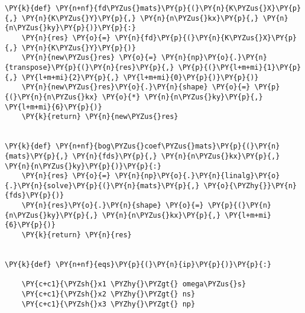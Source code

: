 \begin{Verbatim}[commandchars=\\\{\}]
\PY{k}{def} \PY{n+nf}{fd\PYZus{}mats}\PY{p}{(}\PY{n}{K\PYZus{}X}\PY{p}{,} \PY{n}{K\PYZus{}Y}\PY{p}{,} \PY{n}{n\PYZus{}kx}\PY{p}{,} \PY{n}{n\PYZus{}ky}\PY{p}{)}\PY{p}{:}
    \PY{n}{res} \PY{o}{=} \PY{n}{fd}\PY{p}{(}\PY{n}{K\PYZus{}X}\PY{p}{,} \PY{n}{K\PYZus{}Y}\PY{p}{)}
    \PY{n}{new\PYZus{}res} \PY{o}{=} \PY{n}{np}\PY{o}{.}\PY{n}{transpose}\PY{p}{(}\PY{n}{res}\PY{p}{,} \PY{p}{(}\PY{l+m+mi}{1}\PY{p}{,} \PY{l+m+mi}{2}\PY{p}{,} \PY{l+m+mi}{0}\PY{p}{)}\PY{p}{)}
    \PY{n}{new\PYZus{}res}\PY{o}{.}\PY{n}{shape} \PY{o}{=} \PY{p}{(}\PY{n}{n\PYZus{}kx} \PY{o}{*} \PY{n}{n\PYZus{}ky}\PY{p}{,} \PY{l+m+mi}{6}\PY{p}{)}
    \PY{k}{return} \PY{n}{new\PYZus{}res}


\PY{k}{def} \PY{n+nf}{bog\PYZus{}coef\PYZus{}mats}\PY{p}{(}\PY{n}{mats}\PY{p}{,} \PY{n}{fds}\PY{p}{,} \PY{n}{n\PYZus{}kx}\PY{p}{,} \PY{n}{n\PYZus{}ky}\PY{p}{)}\PY{p}{:}
    \PY{n}{res} \PY{o}{=} \PY{n}{np}\PY{o}{.}\PY{n}{linalg}\PY{o}{.}\PY{n}{solve}\PY{p}{(}\PY{n}{mats}\PY{p}{,} \PY{o}{\PYZhy{}}\PY{n}{fds}\PY{p}{)}
    \PY{n}{res}\PY{o}{.}\PY{n}{shape} \PY{o}{=} \PY{p}{(}\PY{n}{n\PYZus{}ky}\PY{p}{,} \PY{n}{n\PYZus{}kx}\PY{p}{,} \PY{l+m+mi}{6}\PY{p}{)}
    \PY{k}{return} \PY{n}{res}


\PY{k}{def} \PY{n+nf}{eqs}\PY{p}{(}\PY{n}{ip}\PY{p}{)}\PY{p}{:}

    \PY{c+c1}{\PYZsh{}x1 \PYZhy{}\PYZgt{} omega\PYZus{}s}
    \PY{c+c1}{\PYZsh{}x2 \PYZhy{}\PYZgt{} ns}
    \PY{c+c1}{\PYZsh{}x3 \PYZhy{}\PYZgt{} np}
       

\end{Verbatim}
